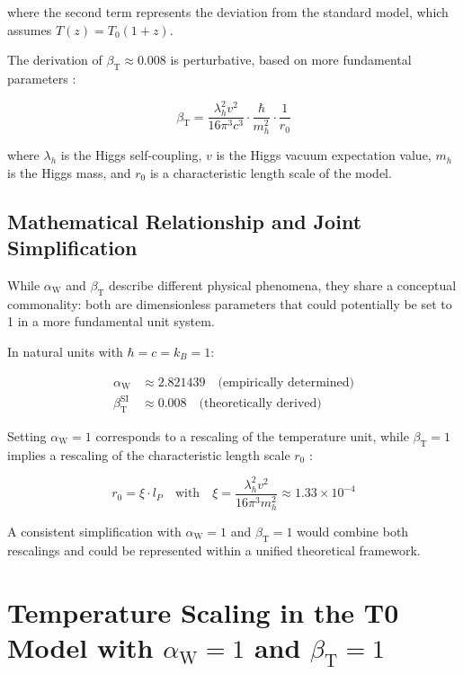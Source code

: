 \documentclass[12pt,a4paper]{article}
\newcommand{\betaT}{\beta_{\text{T}}}
\newcommand{\alphaW}{\alpha_{\text{W}}}
\begin{document}
	where the second term represents the deviation from the standard model, which assumes \(T(z) = T_0 (1 + z)\).
	
	The derivation of \(\betaT \approx 0.008\) is perturbative, based on more fundamental parameters \cite{pascher_params_2025}:
	
	\begin{equation}
		\betaT = \frac{\lambda_h^2 v^2}{16\pi^3 c^3} \cdot \frac{\hbar}{m_h^2} \cdot \frac{1}{r_0}
	\end{equation}
	
	where \(\lambda_h\) is the Higgs self-coupling, \(v\) is the Higgs vacuum expectation value, \(m_h\) is the Higgs mass, and \(r_0\) is a characteristic length scale of the model.
	
	\subsection{Mathematical Relationship and Joint Simplification}
	
	While \(\alphaW\) and \(\betaT\) describe different physical phenomena, they share a conceptual commonality: both are dimensionless parameters that could potentially be set to 1 in a more fundamental unit system.
	
	In natural units with \(\hbar = c = k_B = 1\):
	
	\begin{align}
		\alphaW &\approx 2.821439 \quad \text{(empirically determined)} \\
		\betaT^{\text{SI}} &\approx 0.008 \quad \text{(theoretically derived)}
	\end{align}
	
	Setting \(\alphaW = 1\) corresponds to a rescaling of the temperature unit, while \(\betaT = 1\) implies a rescaling of the characteristic length scale \(r_0\) \cite{pascher_params_2025}:
	
	\begin{equation}
		r_0 = \xi \cdot l_P \quad \text{with} \quad \xi = \frac{\lambda_h^2 v^2}{16\pi^3 m_h^2} \approx 1.33 \times 10^{-4}
	\end{equation}
	
	A consistent simplification with \(\alphaW = 1\) and \(\betaT = 1\) would combine both rescalings and could be represented within a unified theoretical framework.
	
	\section{Temperature Scaling in the T0 Model with \(\alphaW = 1\) and \(\betaT = 1\)}
	
\end{document}
